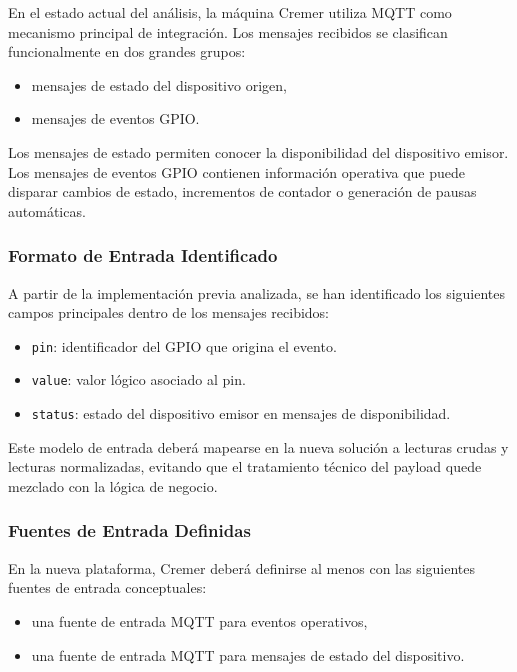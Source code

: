 En el estado actual del análisis, la máquina Cremer utiliza MQTT como mecanismo principal de integración. Los mensajes recibidos se clasifican funcionalmente en dos grandes grupos:

\begin{itemize}
    \item mensajes de estado del dispositivo origen,
    \item mensajes de eventos GPIO.
\end{itemize}

Los mensajes de estado permiten conocer la disponibilidad del dispositivo emisor. Los mensajes de eventos GPIO contienen información operativa que puede disparar cambios de estado, incrementos de contador o generación de pausas automáticas.

\subsubsection{Formato de Entrada Identificado}

A partir de la implementación previa analizada, se han identificado los siguientes campos principales dentro de los mensajes recibidos:

\begin{itemize}
    \item \texttt{pin}: identificador del GPIO que origina el evento.
    \item \texttt{value}: valor lógico asociado al pin.
    \item \texttt{status}: estado del dispositivo emisor en mensajes de disponibilidad.
\end{itemize}

Este modelo de entrada deberá mapearse en la nueva solución a lecturas crudas y lecturas normalizadas, evitando que el tratamiento técnico del payload quede mezclado con la lógica de negocio.

\subsubsection{Fuentes de Entrada Definidas}

En la nueva plataforma, Cremer deberá definirse al menos con las siguientes fuentes de entrada conceptuales:

\begin{itemize}
    \item una fuente de entrada MQTT para eventos operativos,
    \item una fuente de entrada MQTT para mensajes de estado del dispositivo.
\end{itemize}

